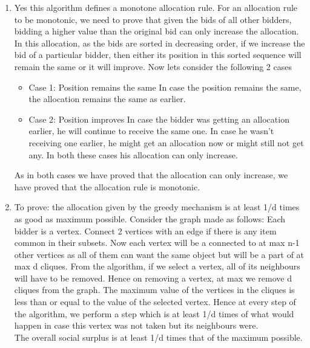 \documentclass{article}
\begin{document}
\begin{enumerate}
\item %
	Yes this algorithm defines a monotone allocation rule. \newline
	For an allocation rule to be monotonic, we need to prove that given the bids of all other bidders, bidding a higher value than the original bid can only increase the allocation. \newline
	In this allocation, as the bids are sorted in decreasing order, if we increase the bid of a particular bidder, then either its position in this sorted sequence will remain the same
	or it will improve. 
	Now lets consider the following 2 cases\newline
	\begin{itemize}
		\item Case 1: Position remains the same \newline
				In case the position remains the same, the allocation remains the same as earlier.
		\item Case 2: Position improves \newline
				In case the bidder was getting an allocation earlier, he will continue to receive the same one. In case he wasn't receiving one earlier, he might get an allocation now or
				might still not get any. In both these cases his allocation can only increase.
	\end{itemize}
	As in both cases we have proved that the allocation can only increase, we have proved that the allocation rule is monotonic.
\item %
	To prove: the allocation given by the greedy mechanism is at least 1/d times as good as maximum possible.
	Consider the graph made as follows: \newline
	Each bidder is a vertex. Connect 2 vertices with an edge if there is any item common in their subsets. \newline
	Now each vertex will be a connected to at max n-1 other vertices as all of them can want the same object but will be a part of at max d cliques. \newline
	From the algorithm, if we select a vertex, all of its neighbours will have to be removed. \newline
	Hence on removing a vertex, at max we remove d cliques from the graph. The maximum value of the vertices in the cliques is less than or equal to the value of the selected vertex. \newline
	Hence at every step of the algorithm, we perform a step which is at least 1/d times of what would happen in case this vertex was not taken but its neighbours were. 
	\\ The overall social surplus is at least 1/d times that of the maximum possible.
\end{enumerate}
\end{document}
